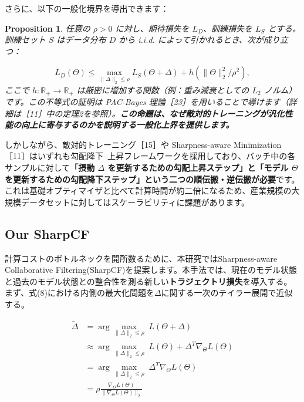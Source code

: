 \documentclass[11pt,a4paper]{article}
\newtheorem{proposition}{Proposition}
\begin{document}
さらに、以下の一般化境界を導出できます：

\begin{proposition}
任意の $\rho > 0$ に対し、期待損失を $L_D$、訓練損失を $L_S$ とする。訓練セット $S$ はデータ分布 $D$ から i.i.d. によって引かれるとき、次が成り立つ：

\begin{equation}
L_D(\Theta) \leq \max_{\|\Delta\|_2 \leq \rho} L_S(\Theta + \Delta) + h(\|\Theta\|_2^2 / \rho^2),
\end{equation}
ここで $h: \mathbb{R}_+ \rightarrow \mathbb{R}_+$ は厳密に増加する関数（例：重み減衰としての $L_2$ ノルム）です。この不等式の証明は PAC-Bayes 理論［23］を用いることで導けます（詳細は［11］中の定理2を参照）。\textbf{この命題は、なぜ敵対的トレーニングが汎化性能の向上に寄与するのかを説明する一般化上界を提供します。}
\end{proposition}

しかしながら、敵対的トレーニング［15］や Sharpness-aware Minimization［11］はいずれも勾配降下–上昇フレームワークを採用しており、バッチ中の各サンプルに対して\textbf{「摂動 $\Delta$ を更新するための勾配上昇ステップ」と「モデル $\Theta$ を更新するための勾配降下ステップ」という二つの順伝搬・逆伝搬が必要}です。これは基礎オプティマイザと比べて計算時間が約二倍になるため、産業規模の大規模データセットに対してはスケーラビリティに課題があります。

\subsection{Our SharpCF}
計算コストのボトルネックを開所数るために、本研究ではSharpness-aware Collaborative Filtering(SharpCF)を提案します。本手法では、現在のモデル状態と過去のモデル状態との整合性を測る新しい\textbf{トラジェクトリ損失}を導入する。
まず、式(8)における内側の最大化問題を$\Delta$に関する一次のテイラー展開で近似する。

\begin{align*}
    \tilde{\Delta} &= \arg \underset{\|\Delta\|_2 \le \rho}{\max} \; L(\Theta + \Delta) \\
    & \approx \arg \underset{\|\Delta\|_2 \le \rho}{\max} \; L(\Theta) + \Delta^T \nabla_\Theta L(\Theta) \\
    & = \arg \underset{\|\Delta\|_2 \le \rho}{\max} \; \Delta^T \nabla_\Theta L(\Theta) \\
    & = \rho \frac{\nabla_\Theta L(\Theta)}{\|\nabla_\Theta L(\Theta)\|_2}
\end{align*}
\end{document}
